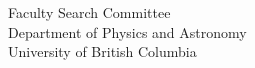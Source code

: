 \documentclass[12pt]{letter}
\begin{document}
\begin{letter}{
               Faculty Search Committee \\
               Department of Physics and Astronomy \\
               University of British Columbia
           }


\end{letter}
\end{document}
